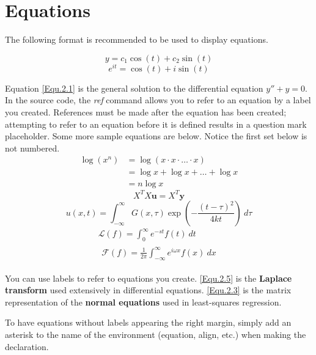 \section{Equations}

The following format is recommended to be used to display equations.

\begin{equation} \label{Equ.2.1}
y=c_1\cos(t)+c_2\sin(t)
\end{equation}
\begin{equation} \label{Equ.2.2}
e^{it}=\cos(t)+i\sin(t)
\end{equation}

Equation \ref{Equ.2.1} is the general solution to the differential equation $y''+y=0$. In the source code, the \textit{ref} command allows you to refer to an equation by a label you created. References must be made after the equation has been created; attempting to refer to an equation before it is defined results in a question mark placeholder. Some more sample equations are below. Notice the first set below is not numbered.
\begin{align*}
\log (x^n) &= \log (x \cdot x \cdot \ldots \cdot x) \\
&= \log x + \log x + \ldots + \log x \\
&= n \log x
\end{align*}
\begin{equation} \label{Equ.2.3}
X^T X \mathbf{u} = X^T \mathbf{y}
\end{equation}
\begin{equation}\label{Equ.2.4}
u(x, t) = \int_{-\infty}^{\infty} G(x, \tau) \exp\left(-\frac{(t-\tau)^2}{4kt}\right) \ d\tau
\end{equation}
\begin{gather}
\mathcal{L}(f) = \int_{0}^{\infty} e^{-st} f(t) \ dt \\
\begin{split} \label{Equ.2.5}
\mathcal{F}(f) = \frac{1}{2\pi}\int_{-\infty}^{\infty} e^{i \omega x} f(x) \ dx
\end{split}
\end{gather}

You can use labels to refer to equations you create. \ref{Equ.2.5} is the \textbf{Laplace transform} used extensively in differential equations. \ref{Equ.2.3} is the matrix representation of the \textbf{normal equations} used in least-squares regression.

To have equations without labels appearing the right margin, simply add an asterisk to the name of the environment (equation, align, etc.) when making the declaration.


